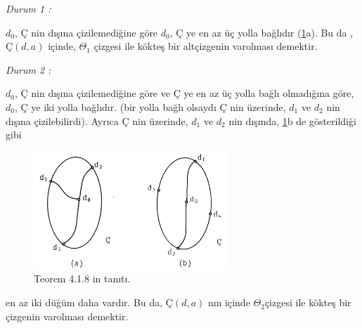 \documentclass[11pt]{amsbook}
\begin{document}
\par
{\itshape Durum 1 :} 

$d_0$, $Ç$ nin dışına çizilemediğine göre $d_0$, $Ç$ ye en az üç yolla bağlıdır (\ref{fig}a). Bu da ,
$Ç(d,a)$ içinde, $\Theta_1$ çizgesi ile kökteş bir altçizgenin varolması demektir. \\

\par
{\itshape Durum 2 :} 

$d_0$, $Ç$ nin dışına çizilemediğine göre ve $Ç$ ye en az üç yolla bağlı olmadığına göre, $d_0$, $Ç$ ye iki yolla 
bağlıdır. (bir yolla bağlı olsaydı $Ç$ nin üzerinde, $d_1$ ve $d_2$ nin dışına çizilebilirdi). Ayrıca $Ç$ nin üzerinde, 
$d_1$ ve $d_2$ nin dışında, \ref{fig}b de gösterildiği gibi
\begin{figure}[htb]
	\centering
	\includegraphics[width=0.65\textwidth]{images/ceyhun-194-fig.png}
	\caption{Teorem 4.1.8 in tanıtı.}
	\label{fig}
\end{figure}
en az iki düğüm daha vardır. Bu da, $Ç(d,a)$ nın içinde $\Theta_2$çizgesi ile kökteş bir çizgenin varolması demektir.
\end{document}
